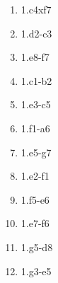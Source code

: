 \begin{enumerate}
\setcounter{enumi}{\value{d_counter}}
\item 1.\bishop{}c4xf7\mate{}
\item 1.\bishop{}d2-c3\mate{}
\item 1.\bishop{}e8-f7\mate{}
\item 1.\bishop{}c1-b2\mate{}
\item 1.\bishop{}e3-c5\mate{}
\item 1.\bishop{}f1-a6\mate{}

\item 1.\bishop{}e5-g7\mate{}
\item 1.\bishop{}e2-f1\mate{}
\item 1.\bishop{}f5-e6\mate{}
\item 1.\bishop{}e7-f6\mate{}
\item 1.\bishop{}g5-d8\mate{}
\item 1.\bishop{}g3-e5\mate{}
\setcounter{d_counter}{\value{enumi}}
\end{enumerate}